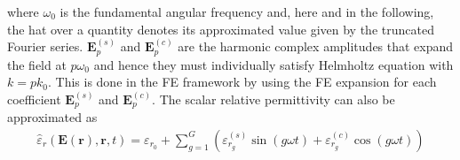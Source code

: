 \documentclass[journal]{IEEEtran}
\renewcommand{\vec}[1]{\mathbf{#1}}
\begin{document}
\noindent where $\omega_0$ is the fundamental angular frequency and, here and in
the following, the hat over a quantity denotes its approximated value given by
the truncated Fourier series. 
$\vec{E}_{p}^{(s)}$ and $\vec{E}_{p}^{(c)}$ are the harmonic complex amplitudes that expand the field at $p\omega_0$ and hence they must individually
satisfy Helmholtz equation with $k=pk_0$. This is done in the FE framework
by using the FE expansion for each coefficient
$\vec{E}_{p}^{(s)}$ and $\vec{E}_{p}^{(c)}$.
The scalar relative permittivity can also be approximated as \cite{Copeland2010}
%
\begin{eqnarray} \label{eq:eps}
\hat{{\varepsilon}}_r(\vec{E}(\vec{r}), \vec{r}, t) = {\varepsilon}_{r_0} + \sum^G_{g=1} 
\left( {\varepsilon}_{r_g}^{(s)} \sin(g \omega t) + {\varepsilon}_{r_g}^{(c)} \cos(g \omega t)
\right)
\end{eqnarray} 
\end{document}
